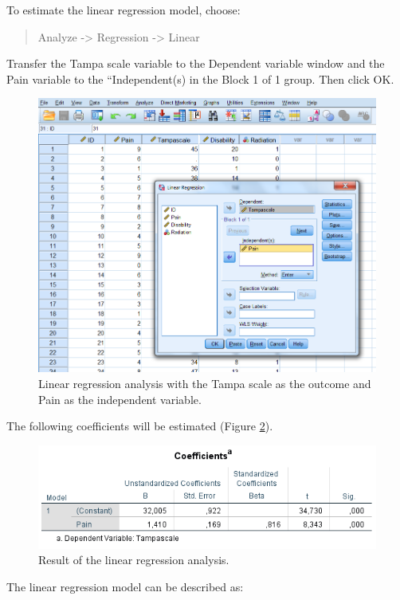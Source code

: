 \documentclass[]{book}
\begin{document}
To estimate the linear regression model, choose:

\begin{quote}
Analyze -\textgreater{} Regression -\textgreater{} Linear
\end{quote}

Transfer the Tampa scale variable to the Dependent variable window and
the Pain variable to the ``Independent(s) in the Block 1 of 1 group.
Then click OK.

\begin{figure}

{\centering \includegraphics[width=0.7\linewidth]{images/fig3.14} 

}

\caption{Linear regression analysis with the Tampa scale as the outcome and Pain as the independent variable.}\label{fig:fig3-14}
\end{figure}

The following coefficients will be estimated (Figure \ref{fig:tab3-3}).

\begin{figure}

{\centering \includegraphics[width=0.7\linewidth]{images/table3.3} 

}

\caption{Result of the linear regression analysis.}\label{fig:tab3-3}
\end{figure}

The linear regression model can be described as:
\end{document}
